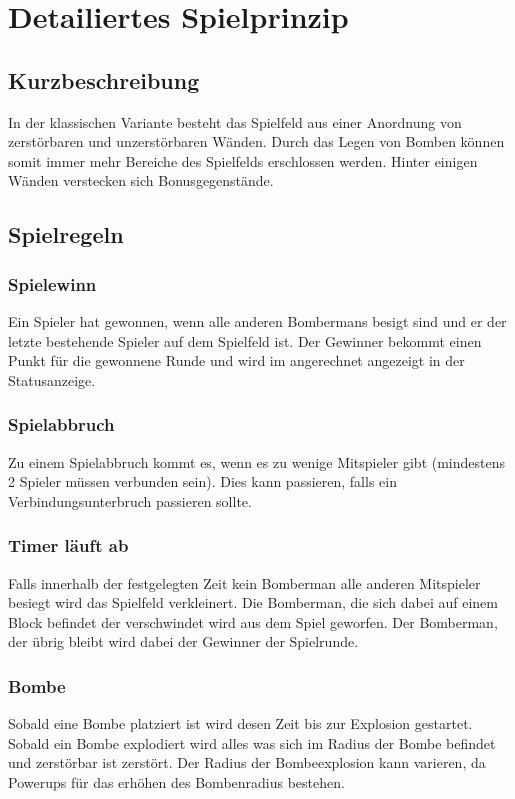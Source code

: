 \documentclass[11pt]{scrartcl}
\begin{document}
\newpage
\section{Detailiertes Spielprinzip}
\label{sec:Detailiertes Spielprinzip}
\subsection{Kurzbeschreibung}
\label{Kurzbeschreibung}
In der klassischen Variante besteht das Spielfeld aus einer Anordnung 
von zerstörbaren und unzerstörbaren Wänden. 
Durch das Legen von Bomben können somit immer mehr 
Bereiche des Spielfelds erschlossen werden. Hinter einigen 
Wänden verstecken sich Bonusgegenstände.\cite{Bomberman Spielprinzip}

\subsection{Spielregeln}
\label{sec:Spielregeln}

\subsubsection{Spielewinn}
\label{sec:Spielgewinn}
Ein Spieler hat gewonnen, wenn alle anderen Bombermans besigt sind und er der letzte bestehende Spieler auf dem Spielfeld ist.
Der Gewinner bekommt einen Punkt für die gewonnene Runde und wird im angerechnet angezeigt in der Statusanzeige.

\subsubsection{Spielabbruch}
\label{sec:Spielabbruch}
Zu einem Spielabbruch kommt es, wenn es zu wenige Mitspieler gibt (mindestens 2 Spieler müssen verbunden sein).
Dies kann passieren, falls ein Verbindungsunterbruch passieren sollte.

\subsubsection{Timer läuft ab}
\label{sec:Timer läuft ab}
Falls innerhalb der festgelegten Zeit kein Bomberman alle anderen Mitspieler besiegt wird das Spielfeld verkleinert.
Die Bomberman, die sich dabei auf einem Block befindet der \grqq{}verschwindet\grqq{} wird aus dem Spiel geworfen.
Der Bomberman, der übrig bleibt wird dabei der Gewinner der Spielrunde.

\subsubsection{Bombe}
\label{sec:Bombe}
Sobald eine Bombe platziert ist wird desen \grqq{}Zeit bis zur Explosion gestartet\grqq{}.
Sobald ein Bombe explodiert wird alles was sich im Radius der Bombe befindet und zerstörbar ist zerstört.
Der Radius der Bombeexplosion kann varieren, da Powerups für das erhöhen des Bombenradius bestehen.
\end{document}
